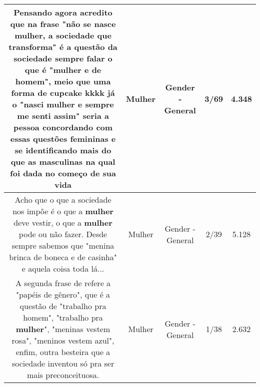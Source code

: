 \documentclass[11pt]{article}
\newlength\mylength
\begin{document}
\begin{center}
\begin{longtable}{|C{.65\mylength}|C{.30\mylength}|C{.12\mylength}|C{.12\mylength}|C{.12\mylength}|}
  \small Pensando agora acredito que na frase "não se nasce \textbf{mulher}, a sociedade que transforma" é a questão da sociedade sempre falar o que é "\textbf{mulher} e de homem", meio que uma forma de cupcake kkkk já o "nasci \textbf{mulher} e sempre me senti assim" seria a pessoa concordando com essas questões femininas e se identificando mais do que as masculinas na qual foi dada no começo de sua vida\normalsize   & Mulher & Gender - General & 3/69 & 4.348 \\  \hline
  \small Acho que o que a sociedade nos impõe é o que a \textbf{mulher} deve vestir, o que a \textbf{mulher} pode ou não fazer. Desde sempre sabemos que "menina brinca de boneca e de casinha" e aquela coisa toda lá...\normalsize   & Mulher & Gender - General & 2/39 & 5.128 \\  \hline
  \small A segunda frase de refere a "papéis de gênero", que é a questão de "trabalho pra homem", "trabalho pra \textbf{mulher}", "meninas vestem rosa", "meninos vestem azul", enfim, outra besteira que a sociedade inventou só pra ser mais preconceituosa.\normalsize   & Mulher & Gender - General & 1/38 & 2.632 \\  \hline

\end{longtable}
\end{center}
\end{document}

